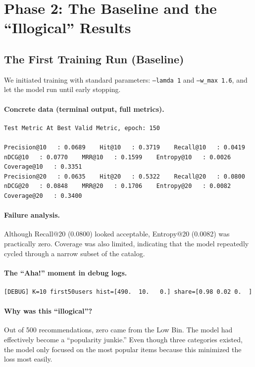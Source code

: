 \documentclass[11pt,a4paper]{article}
\begin{document}
\section{Phase 2: The Baseline and the ``Illogical'' Results}

\subsection{The First Training Run (Baseline)}
We initiated training with standard parameters: \texttt{--lamda 1} and \texttt{--w\_max 1.6}, and let the model run until early stopping.

\paragraph{Concrete data (terminal output, full metrics).}
\begin{lstlisting}[style=textout]
Test Metric At Best Valid Metric, epoch: 150

Precision@10   : 0.0689    Hit@10   : 0.3719    Recall@10   : 0.0419    nDCG@10   : 0.0770    MRR@10   : 0.1599    Entropy@10   : 0.0026    Coverage@10   : 0.3351
Precision@20   : 0.0635    Hit@20   : 0.5322    Recall@20   : 0.0800    nDCG@20   : 0.0848    MRR@20   : 0.1706    Entropy@20   : 0.0082    Coverage@20   : 0.3400
\end{lstlisting}

\paragraph{Failure analysis.}
Although Recall@20 (0.0800) looked acceptable, Entropy@20 (0.0082) was practically zero. Coverage was also limited, indicating that the model repeatedly cycled through a narrow subset of the catalog.

\paragraph{The ``Aha!'' moment in debug logs.}
\begin{lstlisting}[style=textout]
[DEBUG] K=10 first50users hist=[490.  10.   0.] share=[0.98 0.02 0.  ]
\end{lstlisting}

\paragraph{Why was this ``illogical''?}
Out of 500 recommendations, zero came from the Low Bin. The model had effectively become a ``popularity junkie.'' Even though three categories existed, the model only focused on the most popular items because this minimized the loss most easily.
\end{document}
